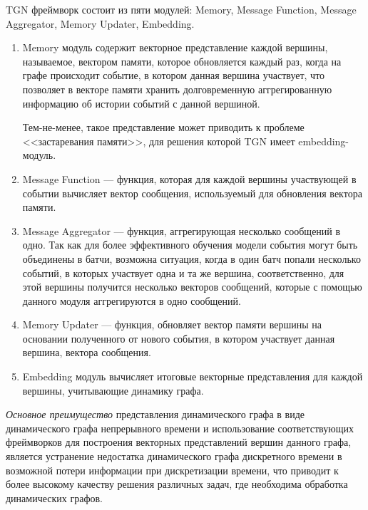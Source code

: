 \documentclass{mipt-thesis-ms}
\begin{document}
TGN фреймворк состоит из пяти модулей: Memory, Message Function, Message Aggregator, Memory Updater, Embedding.
\begin{enumerate}
\item Memory модуль содержит векторное представление каждой вершины, называемое, вектором памяти, которое обновляется каждый раз, когда на графе происходит событие, в котором данная вершина участвует, что позволяет в векторе памяти хранить долговременную аггрегированную информацию об истории событий с данной вершиной.

Тем-не-менее, такое представление может приводить к проблеме <<застаревания памяти>>, для решения которой TGN имеет embedding-модуль.

\item Message Function --- функция, которая для каждой вершины участвующей в событии вычисляет вектор сообщения, используемый для обновления вектора памяти.

\item Message Aggregator --- функция, аггрегирующая несколько сообщений в одно. Так как для более эффективного обучения модели события могут быть объединены в батчи, возможна ситуация, когда в один батч попали несколько событий, в которых участвует одна и та же вершина, соответственно, для этой вершины получится несколько векторов сообщений, которые с помощью данного модуля аггрегируются в одно сообщений.

\item Memory Updater --- функция, обновляет вектор памяти вершины на основании полученного от нового события, в котором участвует данная вершина, вектора сообщения.

\item Embedding модуль вычисляет итоговые векторные представления для каждой вершины, учитывающие динамику графа.
\end{enumerate}

{\it Основное преимущество} представления динамического графа в виде динамического графа непрерывного времени и использование соответствующих фреймворков для построения векторных представлений вершин данного графа, является устранение недостатка динамического графа дискретного времени в возможной потери информации при дискретизации времени, что приводит к более высокому качеству решения различных задач, где необходима обработка динамических графов.\\


\end{document}
